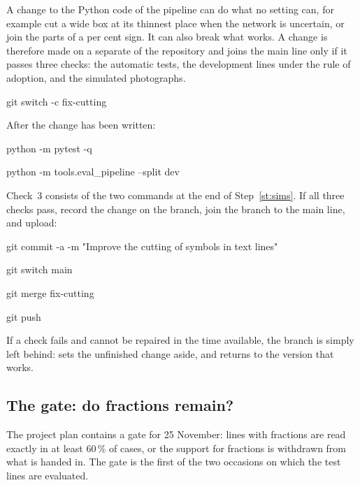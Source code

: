 A change to the Python code of the pipeline can do what no setting can, for example cut a wide
box at its thinnest place when the network is uncertain, or join the parts of a per cent sign.
It can also break what works. A change is therefore made on a separate  of the
repository and joins the main line only if it passes three checks: the automatic tests, the
development lines under the rule of adoption, and the simulated photographs.
\begin{ps}
git switch -c fix-cutting
\end{ps}
After the change has been written:
\begin{ps}
python -m pytest -q
\end{ps}
\begin{ps}
python -m tools.eval_pipeline --split dev
\end{ps}
Check~3 consists of the two commands at the end of Step~\ref{st:sims}. If all three checks
pass, record the change on the branch, join the branch to the main line, and upload:
\begin{ps}
git commit -a -m "Improve the cutting of symbols in text lines"
\end{ps}
\begin{ps}
git switch main
\end{ps}
\begin{ps}
git merge fix-cutting
\end{ps}
\begin{ps}
git push
\end{ps}
If a check fails and cannot be repaired in the time available, the branch is simply left
behind:  sets the unfinished change aside, and  returns to
the version that works.

\subsection{The gate: do fractions remain?}
\label{sec:gate}

The project plan contains a gate for 25 November: lines with fractions are read exactly in at
least 60\,\% of cases, or the support for fractions is withdrawn from what is handed in. The
gate is the first of the two occasions on which the test lines are evaluated.

